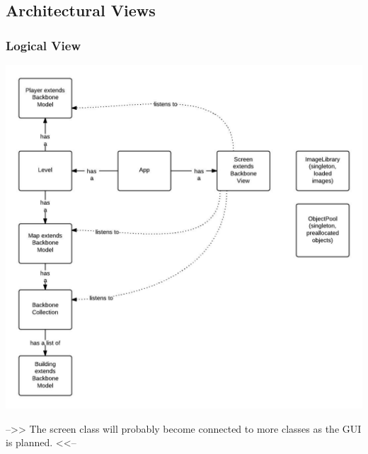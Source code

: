 \subsection{Architectural Views}

\subsubsection{Logical View} %

\includegraphics[width=\textwidth]{pictures/class_diagram}

-->> The screen class will probably become connected to more classes as the GUI is planned. <<--

